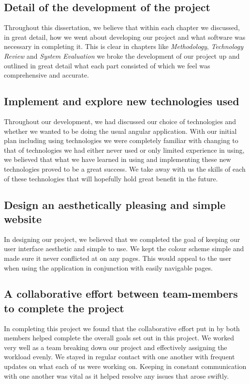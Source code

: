 \subsection{Detail of the development of the project}
Throughout this dissertation, we believe that within each chapter we discussed, in great detail, how we went about developing our project and what software was necessary in completing it. This is clear in chapters like \textit{Methodology}, \textit{Technology Review} and \textit{System Evaluation} we broke the development of our project up and outlined in great detail what each part consisted of which we feel was comprehensive and accurate.

\subsection{Implement and explore new technologies used}
Throughout our development, we had discussed our choice of technologies and whether we wanted to be doing the usual angular application. With our initial plan including using technologies we were completely familiar with changing to that of technologies we had either never used or only limited experience in using, we believed that what we have learned in using and implementing these new technologies proved to be a great success. We take away with us the skills of each of these technologies that will hopefully hold great benefit in the future.

\subsection{Design an aesthetically pleasing and simple website}
In designing our project, we believed that we completed the goal of keeping our user interface aesthetic and simple to use. We kept the colour scheme simple and made sure it never conflicted at on any pages. This would appeal to the user when using the application in conjunction with easily navigable pages.

\subsection{A collaborative effort between team-members to complete the project}
In completing this project we found that the collaborative effort put in by both members helped complete the overall goals set out in this project. We worked very well as a team breaking down our project and effectively assigning the workload evenly. We stayed in regular contact with one another with frequent updates on what each of us were working on. Keeping in constant communication with one another was vital as it helped resolve any issues that arose swiftly.


